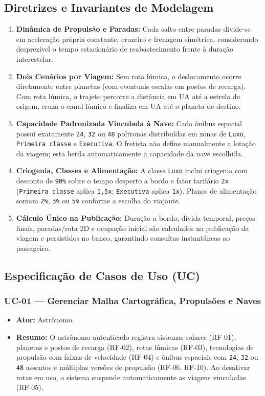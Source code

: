 \documentclass[12pt, a4paper]{article}
\begin{document}
\subsection{Diretrizes e Invariantes de Modelagem}
\begin{enumerate}
    \item \textbf{Dinâmica de Propulsão e Paradas:} Cada salto entre paradas divide-se em aceleração própria constante, cruzeiro e frenagem simétrica, considerando desprezível o tempo estacionário de reabastecimento frente à duração interestelar.
    \item \textbf{Dois Cenários por Viagem:} Sem rota lúmica, o deslocamento ocorre diretamente entre planetas (com eventuais escalas em postos de recarga). Com rota lúmica, o trajeto percorre a distância em UA até a estrela de origem, cruza o canal lúmico e finaliza em UA até o planeta de destino.
    \item \textbf{Capacidade Padronizada Vinculada à Nave:} Cada ônibus espacial possui exatamente \texttt{24}, \texttt{32} ou \texttt{48} poltronas distribuídas em zonas de \texttt{Luxo}, \texttt{Primeira classe} e \texttt{Executiva}. O fretista não define manualmente a lotação da viagem; esta herda automaticamente a capacidade da nave escolhida.
    \item \textbf{Criogenia, Classes e Alimentação:} A classe \texttt{Luxo} inclui criogenia com desconto de \texttt{90\%} sobre o tempo desperto a bordo e fator tarifário \texttt{2x} (\texttt{Primeira classe} aplica \texttt{1,5x}; \texttt{Executiva} aplica \texttt{1x}). Planos de alimentação somam \texttt{2\%}, \texttt{3\%} ou \texttt{5\%} conforme a escolha do viajante.
    \item \textbf{Cálculo Único na Publicação:} Duração a bordo, dívida temporal, preços finais, paradas/rota 2D e ocupação inicial são calculados na publicação da viagem e persistidos no banco, garantindo consultas instantâneas ao passageiro.
\end{enumerate}

\subsection{Especificação de Casos de Uso (UC)}

\subsubsection{UC-01 --- Gerenciar Malha Cartográfica, Propulsões e Naves}
\begin{itemize}
    \item \textbf{Ator:} Astrônomo.
    \item \textbf{Resumo:} O astrônomo autenticado registra sistemas solares (RF-01), planetas e postos de recarga (RF-02), rotas lúmicas (RF-03), tecnologias de propulsão com faixas de velocidade (RF-04) e ônibus espaciais com \texttt{24}, \texttt{32} ou \texttt{48} assentos e múltiplas versões de propulsão (RF-06, RF-10). Ao desativar rotas em uso, o sistema suspende automaticamente as viagens vinculadas (RF-05).
\end{itemize}
\end{document}
